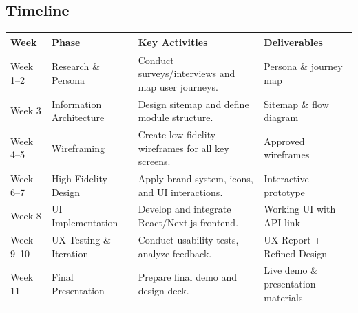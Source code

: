 \subsection{Timeline}
\renewcommand{\arraystretch}{1.12}
\begin{tabularx}{\textwidth}{|>{\raggedright\arraybackslash}p{2.3cm}|>{\raggedright\arraybackslash}p{2.9cm}|>{\raggedright\arraybackslash}X|>{\raggedright\arraybackslash}p{3.4cm}|}
\hline
	\textbf{Week} & \textbf{Phase} & \textbf{Key Activities} & \textbf{Deliverables} \\
\hline
Week 1--2 & Research \& Persona & Conduct surveys/interviews and map user journeys. & Persona \& journey map \\
\hline
Week 3 & Information Architecture & Design sitemap and define module structure. & Sitemap \& flow diagram \\
\hline
Week 4--5 & Wireframing & Create low-fidelity wireframes for all key screens. & Approved wireframes \\
\hline
Week 6--7 & High-Fidelity Design & Apply brand system, icons, and UI interactions. & Interactive prototype \\
\hline
Week 8 & UI Implementation & Develop and integrate React/Next.js frontend. & Working UI with API link \\
\hline
Week 9--10 & UX Testing \& Iteration & Conduct usability tests, analyze feedback. & UX Report + Refined Design \\
\hline
Week 11 & Final Presentation & Prepare final demo and design deck. & Live demo \& presentation materials \\
\hline
\end{tabularx}
